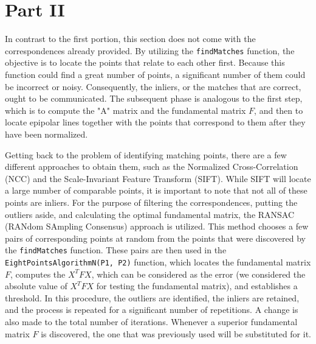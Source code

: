 \section{Part II}\label{P2}

In contrast to the first portion, this section does not come with the correspondences already provided. By utilizing the \texttt{findMatches} function, the objective is to locate the points that relate to each other first. Because this function could find a great number of points, a significant number of them could be incorrect or noisy. Consequently, the inliers, or the matches that are correct, ought to be communicated. The subsequent phase is analogous to the first step, which is to compute the "A" matrix and the fundamental matrix $F$, and then to locate epipolar lines together with the points that correspond to them after they have been normalized.

Getting back to the problem of identifying matching points, there are a few different approaches to obtain them, such as the Normalized Cross-Correlation (NCC) and the Scale-Invariant Feature Transform (SIFT). While SIFT will locate a large number of comparable points, it is important to note that not all of these points are inliers. For the purpose of filtering the correspondences, putting the outliers aside, and calculating the optimal fundamental matrix, the RANSAC (RANdom SAmpling Consensus) approach is utilized. This method chooses a few pairs of corresponding points at random from the points that were discovered by the \texttt{findMatches} function. These pairs are then used in the \texttt{EightPointsAlgorithmN(P1, P2)} function, which locates the fundamental matrix $F$, computes the $X^TFX$, which can be considered as the error (we considered the absolute value of $X^TFX$ for testing the fundamental matrix), and establishes a threshold. In this procedure, the outliers are identified, the inliers are retained, and the process is repeated for a significant number of repetitions. A change is also made to the total number of iterations. Whenever a superior fundamental matrix $F$ is discovered, the one that was previously used will be substituted for it. 

